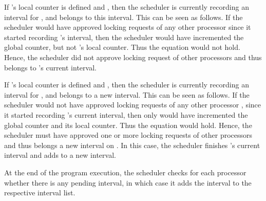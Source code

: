 If 's local counter is defined and , then the scheduler is currently recording an interval for , and  belongs to this interval. This can be seen as follows. If the scheduler would have approved locking requests of any other processor  since it started recording 's interval, then the scheduler would have incremented the global counter, but not 's local counter. Thus the equation would not hold. Hence, the scheduler did not approve locking request of other processors and thus  belongs to 's current interval. 

If 's local counter is defined and , then the scheduler is currently recording an interval for , and  belongs to a new interval. This can be seen as follows. If the scheduler would not have approved locking requests of any other processor , since it started recording 's current interval, then only  would have incremented the global counter and its local counter. Thus the equation would hold. Hence, the scheduler must have approved one or more locking requests of other processors and thus  belongs a new interval on . In this case, the scheduler finishes 's current interval and adds  to a new interval. 

At the end of the program execution, the scheduler checks for each processor whether there is any pending interval, in which case it adds the interval to the respective interval list.

